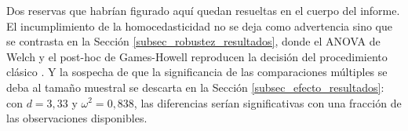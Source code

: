         \vspace{10pt}

        Dos reservas que habrían figurado aquí quedan resueltas en el cuerpo del
        informe. El incumplimiento de la homocedasticidad no se deja como
        advertencia sino que se contrasta en la Sección
        \ref{subsec_robustez_resultados}, donde el ANOVA de Welch y el post-hoc de
        Games-Howell reproducen la decisión del procedimiento clásico
        \cite{montgomery2020design}. Y la sospecha de que la significancia de las
        comparaciones múltiples se deba al tamaño muestral se descarta en la
        Sección \ref{subsec_efecto_resultados}: con $d = 3{,}33$ y
        $\omega^2 = 0{,}838$, las diferencias serían significativas con una
        fracción de las observaciones disponibles.